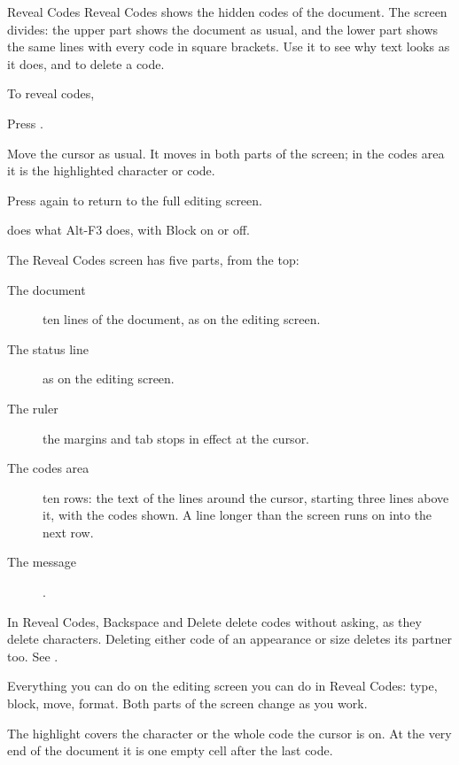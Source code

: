 \begin{Feature}{Reveal Codes}
Reveal Codes shows the hidden codes of the document.  The screen divides:
the upper part shows the document as usual, and the lower part shows the
same lines with every code in square brackets.  Use it to see why text
looks as it does, and to delete a code.

To reveal codes,
\begin{WPSteps}
\item Press .
\item Move the cursor as usual.  It moves in both parts of the screen; in
the codes area it is the highlighted character or code.
\item Press  again to return to the full editing
screen.
\end{WPSteps}
 does what Alt-F3 does, with Block on or off.

The Reveal Codes screen has five parts, from the top:
\begin{description}
\item[The document] ten lines of the document, as on the editing screen.
\item[The status line] as on the editing screen.
\item[The ruler] the margins and tab stops in effect at the cursor.
\item[The codes area] ten rows: the text of the lines around the cursor,
starting three lines above it, with the codes shown.  A line longer than the
screen runs on into the next row.
\item[The message] .
\end{description}

\Notes
{}
In Reveal Codes, Backspace and Delete delete codes without asking, as they
delete characters.  Deleting either code of an appearance or size deletes
its partner too.  See .

Everything you can do on the editing screen you can do in Reveal Codes:
type, block, move, format.  Both parts of the screen change as you work.

The highlight covers the character or the whole code the cursor is on.  At
the very end of the document it is one empty cell after the last code.


\end{Feature}
